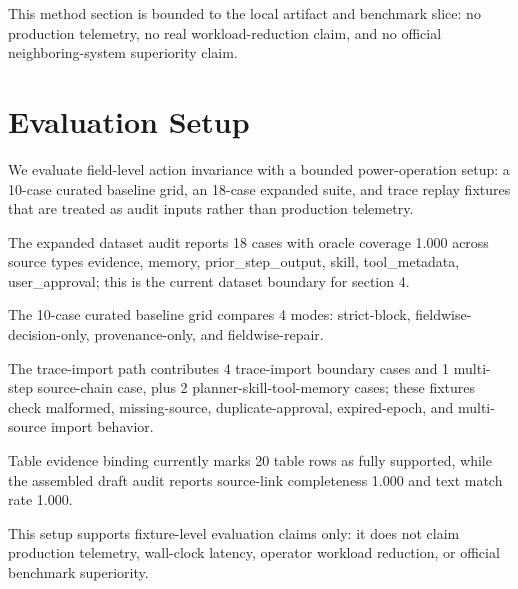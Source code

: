 \documentclass[11pt]{article}
\begin{document}
This method section is bounded to the local artifact and benchmark slice: no production telemetry, no real workload-reduction claim, and no official neighboring-system superiority claim.

\section{Evaluation Setup}

We evaluate field-level action invariance with a bounded power-operation setup: a 10-case curated baseline grid, an 18-case expanded suite, and trace replay fixtures that are treated as audit inputs rather than production telemetry.

The expanded dataset audit reports 18 cases with oracle coverage 1.000 across source types evidence, memory, prior\_step\_output, skill, tool\_metadata, user\_approval; this is the current dataset boundary for section 4.

The 10-case curated baseline grid compares 4 modes: strict-block, fieldwise-decision-only, provenance-only, and fieldwise-repair.

The trace-import path contributes 4 trace-import boundary cases and 1 multi-step source-chain case, plus 2 planner-skill-tool-memory cases; these fixtures check malformed, missing-source, duplicate-approval, expired-epoch, and multi-source import behavior.

Table evidence binding currently marks 20 table rows as fully supported, while the assembled draft audit reports source-link completeness 1.000 and text match rate 1.000.

This setup supports fixture-level evaluation claims only: it does not claim production telemetry, wall-clock latency, operator workload reduction, or official benchmark superiority.
\end{document}
